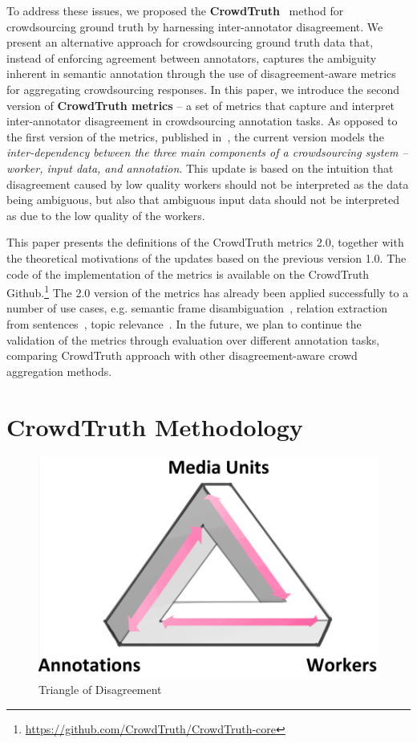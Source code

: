 To address these issues, we proposed the \textbf{CrowdTruth}~\cite{aroyo2014AIMag} method for crowdsourcing ground truth by harnessing inter-annotator disagreement.  We present an alternative approach for crowdsourcing ground truth data that, instead of enforcing agreement between annotators, captures the ambiguity inherent in semantic annotation through the use of disagreement-aware metrics for aggregating crowdsourcing responses.  In this paper, we introduce the second version of \textbf{CrowdTruth metrics} -- a set of metrics that capture and interpret inter-annotator disagreement in crowdsourcing annotation tasks. As opposed to the first version of the metrics, published in~\cite{inel2014crowdtruth}, the current version models the \textit{inter-dependency between the three main components of a crowdsourcing system -- worker, input data, and annotation}. This update is based on the intuition that disagreement caused by low quality workers should not be interpreted as the data being ambiguous, but also that ambiguous input data should not be interpreted as due to the low quality of the workers.


This paper presents the definitions of the CrowdTruth metrics 2.0, together with the theoretical motivations of the updates based on the previous version 1.0. The code of the implementation of the metrics is available on the CrowdTruth Github.\footnote{\url{https://github.com/CrowdTruth/CrowdTruth-core}} The 2.0 version of the metrics has already been applied successfully to a number of use cases, e.g. semantic frame disambiguation~\cite{dumitrache2018capturing}, relation extraction from sentences~\cite{dumitrache2017false}, topic relevance~\cite{inel2018studying}. In the future, we plan to continue the validation of the metrics through evaluation over different annotation tasks, comparing CrowdTruth approach with other disagreement-aware crowd aggregation methods.

\section{CrowdTruth Methodology}

 \begin{figure}[!bth]
 	\centering
 		\includegraphics[width=0.7\linewidth]{img/triangle.png}
 	\caption{Triangle of Disagreement}
 	\label{fig:tor}
 \end{figure}

